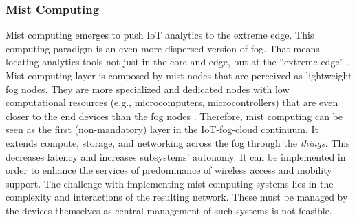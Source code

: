 \subsubsection{Mist Computing}
Mist computing emerges to push IoT analytics to the extreme edge. This computing paradigm is an even more dispersed version of fog. That means locating analytics tools not just in the core and edge, but at the ``extreme edge'' \cite{Ciscopus95:online}. Mist computing layer is composed by mist nodes that are perceived as lightweight fog nodes. They are more specialized and dedicated nodes with low computational resources (e.g., microcomputers, microcontrollers) that are even closer to the end devices than the fog nodes \cite{iorga2018fog}. Therefore, mist computing can be seen as the first (non-mandatory) layer in the IoT-fog-cloud continuum. It extends compute, storage, and networking across the fog through the \textit{things}. This decreases latency and increases subsystems' autonomy. It can be implemented in order to enhance the services of predominance of wireless access and mobility support. The challenge with implementing mist computing systems lies in the complexity and interactions of the resulting network. These must be managed by the devices themselves as central management of such systems is not feasible.


